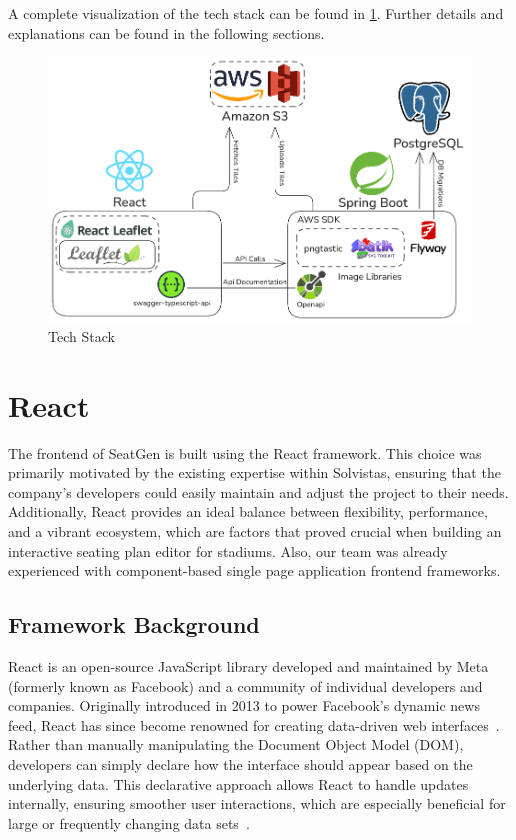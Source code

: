 A complete visualization of the tech stack can be found in \ref{fig:tech-stack}. Further details and explanations can be found in the following sections.

\begin{figure}[H]
    \centering
    \includegraphics[scale=0.4]{pics/tech-stack.png}
    \caption{Tech Stack}
    \label{fig:tech-stack}
\end{figure}


\section{React}
The frontend of SeatGen is built using the React framework. This choice was primarily motivated by the existing expertise within Solvistas, ensuring that the company’s developers could easily maintain and adjust the project to their needs. Additionally, React provides an ideal balance between flexibility, performance, and a vibrant ecosystem, which are factors that proved crucial when building an interactive seating plan editor for stadiums. Also, our team was already experienced with component-based single page application frontend frameworks.

\subsection{Framework Background}
React is an open-source JavaScript library developed and maintained by Meta (formerly known as Facebook) and a community of individual developers and companies. Originally introduced in 2013 to power Facebook’s dynamic news feed, React has since become renowned for creating data-driven web interfaces~\cite{ReactDocs, SPAComp}. Rather than manually manipulating the Document Object Model (DOM), developers can simply declare how the interface should appear based on the underlying data. This declarative approach allows React to handle updates internally, ensuring smoother user interactions, which are especially beneficial for large or frequently changing data sets~\cite{ReactVirtualDOM, SPAComp}.

